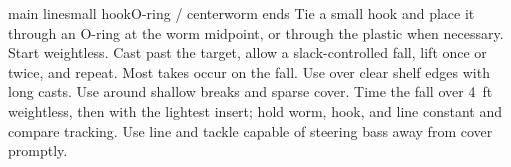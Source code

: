 
{{main line}{small hook}{O-ring / center}{worm ends}}
{Tie a small hook and place it through an O-ring at the worm midpoint, or
through the plastic when necessary. Start weightless.}
{Cast past the target, allow a slack-controlled fall, lift once or twice, and
repeat. Most takes occur on the fall.}
{Use over clear shelf edges with long casts.}
{Use around shallow breaks and sparse cover.}
{Time the fall over \qty{4}{ft} weightless, then with the lightest insert;
hold worm, hook, and line constant and compare tracking.}
{Use line and tackle capable of steering bass away from cover promptly.}
